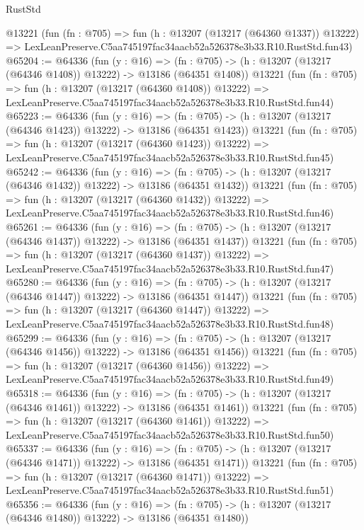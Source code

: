 \begin{lexlean}{RustStd}
\begin{coremodule}
    @13221
    (fun (fn : @705) =>
    fun (h : @13207 (@13217 (@64360 @1337)) @13222) =>
    LexLeanPreserve.C5aa745197fac34aacb52a526378e3b33.R10.RustStd.fun43)
@65204 := @64336
    (fun (y : @16) =>
    (fn : @705) -> (h : @13207 (@13217 (@64346 @1408)) @13222) -> @13186 (@64351 @1408))
    @13221
    (fun (fn : @705) =>
    fun (h : @13207 (@13217 (@64360 @1408)) @13222) =>
    LexLeanPreserve.C5aa745197fac34aacb52a526378e3b33.R10.RustStd.fun44)
@65223 := @64336
    (fun (y : @16) =>
    (fn : @705) -> (h : @13207 (@13217 (@64346 @1423)) @13222) -> @13186 (@64351 @1423))
    @13221
    (fun (fn : @705) =>
    fun (h : @13207 (@13217 (@64360 @1423)) @13222) =>
    LexLeanPreserve.C5aa745197fac34aacb52a526378e3b33.R10.RustStd.fun45)
@65242 := @64336
    (fun (y : @16) =>
    (fn : @705) -> (h : @13207 (@13217 (@64346 @1432)) @13222) -> @13186 (@64351 @1432))
    @13221
    (fun (fn : @705) =>
    fun (h : @13207 (@13217 (@64360 @1432)) @13222) =>
    LexLeanPreserve.C5aa745197fac34aacb52a526378e3b33.R10.RustStd.fun46)
@65261 := @64336
    (fun (y : @16) =>
    (fn : @705) -> (h : @13207 (@13217 (@64346 @1437)) @13222) -> @13186 (@64351 @1437))
    @13221
    (fun (fn : @705) =>
    fun (h : @13207 (@13217 (@64360 @1437)) @13222) =>
    LexLeanPreserve.C5aa745197fac34aacb52a526378e3b33.R10.RustStd.fun47)
@65280 := @64336
    (fun (y : @16) =>
    (fn : @705) -> (h : @13207 (@13217 (@64346 @1447)) @13222) -> @13186 (@64351 @1447))
    @13221
    (fun (fn : @705) =>
    fun (h : @13207 (@13217 (@64360 @1447)) @13222) =>
    LexLeanPreserve.C5aa745197fac34aacb52a526378e3b33.R10.RustStd.fun48)
@65299 := @64336
    (fun (y : @16) =>
    (fn : @705) -> (h : @13207 (@13217 (@64346 @1456)) @13222) -> @13186 (@64351 @1456))
    @13221
    (fun (fn : @705) =>
    fun (h : @13207 (@13217 (@64360 @1456)) @13222) =>
    LexLeanPreserve.C5aa745197fac34aacb52a526378e3b33.R10.RustStd.fun49)
@65318 := @64336
    (fun (y : @16) =>
    (fn : @705) -> (h : @13207 (@13217 (@64346 @1461)) @13222) -> @13186 (@64351 @1461))
    @13221
    (fun (fn : @705) =>
    fun (h : @13207 (@13217 (@64360 @1461)) @13222) =>
    LexLeanPreserve.C5aa745197fac34aacb52a526378e3b33.R10.RustStd.fun50)
@65337 := @64336
    (fun (y : @16) =>
    (fn : @705) -> (h : @13207 (@13217 (@64346 @1471)) @13222) -> @13186 (@64351 @1471))
    @13221
    (fun (fn : @705) =>
    fun (h : @13207 (@13217 (@64360 @1471)) @13222) =>
    LexLeanPreserve.C5aa745197fac34aacb52a526378e3b33.R10.RustStd.fun51)
@65356 := @64336
    (fun (y : @16) =>
    (fn : @705) -> (h : @13207 (@13217 (@64346 @1480)) @13222) -> @13186 (@64351 @1480))

\end{coremodule}
\end{lexlean}
